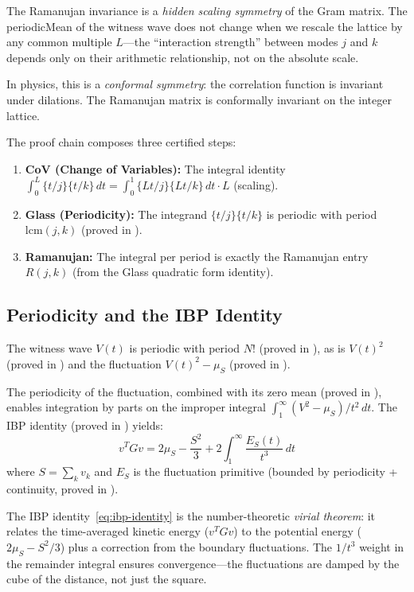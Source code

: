 \begin{principle}
The Ramanujan invariance is a \emph{hidden scaling symmetry} of
the Gram matrix. The periodicMean of the witness wave does not
change when we rescale the lattice by any common multiple $L$---the
``interaction strength'' between modes $j$ and $k$ depends only on
their arithmetic relationship, not on the absolute scale.

In physics, this is a \emph{conformal symmetry}: the correlation
function is invariant under dilations. The Ramanujan matrix is
conformally invariant on the integer lattice.

The proof chain composes three certified steps:
\begin{enumerate}
  \item \textbf{CoV (Change of Variables):} The integral identity
    $\int_0^L \{t/j\}\{t/k\}\,dt = \int_0^1 \{Lt/j\}\{Lt/k\}\,dt
    \cdot L$ (scaling).
  \item \textbf{Glass (Periodicity):} The integrand $\{t/j\}\{t/k\}$
    is periodic with period $\mathrm{lcm}(j,k)$ (proved in
    ).
  \item \textbf{Ramanujan:} The integral per period is exactly the
    Ramanujan entry $R(j,k)$ (from the Glass quadratic form identity).
\end{enumerate}
\end{principle}

\subsection{Periodicity and the IBP Identity}

The witness wave $V(t)$ is periodic with period $N!$ (proved in
), as is $V(t)^2$ (proved in
) and the fluctuation $V(t)^2 - \mu_S$
(proved in ).

The periodicity of the fluctuation, combined with its zero mean
(proved in ), enables integration by parts
on the improper integral $\int_1^\infty (V^2 - \mu_S)/t^2\,dt$.
The IBP identity (proved in ) yields:
\begin{equation}
  v^T G v = 2\mu_S - \frac{S^2}{3} + 2\int_1^\infty
  \frac{E_S(t)}{t^3}\,dt
  \label{eq:ibp-identity}
\end{equation}
where $S = \sum_k v_k$ and $E_S$ is the fluctuation primitive
(bounded by periodicity + continuity, proved in
).

\begin{correspondence}
The IBP identity~\eqref{eq:ibp-identity} is the number-theoretic
\emph{virial theorem}: it relates the time-averaged kinetic energy
($v^T G v$) to the potential energy ($2\mu_S - S^2/3$) plus a
correction from the boundary fluctuations. The $1/t^3$ weight in the
remainder integral ensures convergence---the fluctuations are damped
by the cube of the distance, not just the square.
\end{correspondence}
